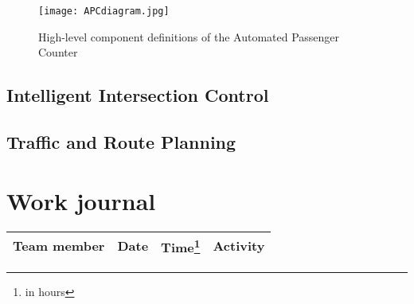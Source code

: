 \documentclass[a4paper,draft]{article}
\begin{document}
\begin{sidewaysfigure}
	\centering
	\texttt{[image: APCdiagram.jpg]}
	\caption{High-level component definitions of the Automated Passenger
		Counter}%
	\label{fig:APCdiagram}
\end{sidewaysfigure}

\subsection{Intelligent Intersection Control}


\subsection{Traffic and Route Planning}





\section{Work journal}

\begin{tabularx}{\textwidth}{l l l X}
	\toprule
	Team member & Date & Time\footnote{in hours} & Activity \\ \midrule
	\bottomrule
\end{tabularx}

\clearpage
\printglossaries
\end{document}
